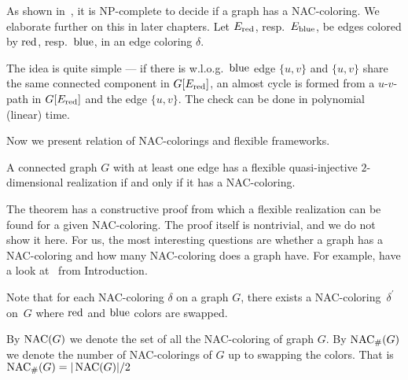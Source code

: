 As shown in~\cite{np_complete}, it is NP-complete to decide if a graph has a NAC-coloring.
We elaborate further on this in later chapters.
Let \( E_{\text{red}}\), resp.\ \( E_{\text{blue}} \), be edges colored by \( \text{red} \), resp.~\( \text{blue} \),
in an edge coloring \( \delta \).
%
%
The idea is quite simple --- if there is w.l.o.g.\ \( \text{blue} \) edge \( \{u, v\} \)
and \( \{u, v\} \) share the same connected component in \( G[E_{\text{red}}] \),
an almost cycle is formed from a \( u \)-\( v \)-path in \( G[E_{\text{red}}] \)
and the edge \( \{u, v\} \).
The check can be done in polynomial (linear) time.

Now we present relation of NAC-colorings and flexible frameworks.
%
\begin{theorem}
	A connected graph \( G \) with at least one edge has a flexible
	quasi-injective \( 2 \)-dimensional realization if and only if it has a NAC-coloring.
\end{theorem}
%
The theorem has a constructive proof from which a flexible realization
can be found for a given NAC-coloring.
The proof itself is nontrivial, and we do not show it here.
For us, the most interesting questions are whether a graph has a NAC-coloring
and how many NAC-coloring does a graph have.
For example, have a look at~
from Introduction.

Note that for each NAC-coloring \( \delta \) on a graph \( G \),
there exists a NAC-coloring~\( \delta^\prime \) on~\( G \)
where \( \text{red} \) and \( \text{blue} \) colors are swapped.
%
\begin{definition}
	By \( \operatorname{NAC}(G) \) we denote the set of all the NAC-coloring of graph \( G \).
	By \( \operatorname{NAC}_{\#} (G) \) we denote the number of NAC-colorings of \( G \)
	up to swapping the colors.
	That is \( \operatorname{NAC}_{\#} (G) = | \operatorname{NAC}(G) | / 2 \)
\end{definition}
%

